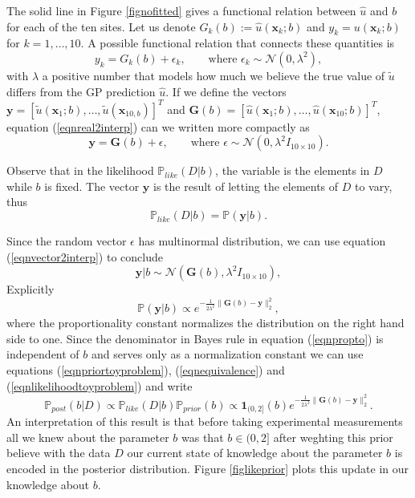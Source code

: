 \documentclass[12pt]{book}
\newcommand{\post}{\mathbb{P}_{post}}
\newcommand{\like}{\mathbb{P}_{like}}
\newcommand{\prior}{\mathbb{P}_{prior}}
\newcommand{\p}{\mathbb{P}}
\newcommand{\x}{\textbf{x}}
\begin{document}
The solid line in Figure \ref{fignofitted} gives a functional relation between $\hat{u}$ and $b$ for each of the 
ten sites.
Let us denote $G_{k}(b):=\hat{u}(\x_{k};b)$ and $y_{k}=u(\x_{k};b)$ for $k=1,\ldots,10$. A possible 
functional relation
that connects these quantities is
\begin{equation}\label{eqnreal2interp}
y_{k}=G_{k}(b)+\epsilon_{k},\qquad\text{where } \epsilon_{k}\sim\mathcal{N}(0,\lambda^{2}),
\end{equation}
with $\lambda$ a positive number that models how much we believe the true value of $\tilde{u}$ differs from the GP prediction $\hat{u}$.
If we define the vectors $\textbf{y}=[\tilde{u}(\x_{1};b),\ldots,\tilde{u}(\x_{10,b})]^{T}$ and 
$\textbf{G}(b)=[\hat{u}(\x_{1};b),\ldots,\hat{u}(\x_{10};b)]^{T}$, equation (\ref{eqnreal2interp}) can we written more compactly as
\begin{equation}\label{eqnvector2interp}
\textbf{y}=\textbf{G}(b)+\epsilon,\qquad\text{where }\epsilon\sim\mathcal{N}(0,\lambda^{2} I_{10\times 10}).
\end{equation}

Observe that in the likelihood $\like(D|b)$, the variable is the elements in $D$ while $b$ is fixed. The
vector $\textbf{y}$ is the result of letting the elements of $D$ to vary, thus
\begin{equation}\label{eqnequivalence}
\like(D|b)=\p(\textbf{y}|b).
\end{equation}

Since the random vector $\epsilon$ has multinormal distribution, we can use equation (\ref{eqnvector2interp})
to conclude \cite{Somersalo}
\begin{equation*}
\textbf{y}|b\sim \mathcal{N}(\textbf{G}(b),\lambda^{2} I_{10\times 10}),
\end{equation*}
Explicitly
\begin{equation}\label{eqnlikelihoodtoyproblem}
\p(\textbf{y}|b)\propto e^{-\frac{1}{2\lambda^{2}}\|\textbf{G}(b)-\textbf{y}\|_{2}^{2}},
\end{equation}
where the proportionality constant normalizes the distribution on the right hand side to one. Since
the denominator in Bayes rule in equation (\ref{eqnpropto}) is independent of $b$ and serves only 
as a normalization constant we can use equations (\ref{eqnpriortoyproblem}), (\ref{eqnequivalence}) and (\ref{eqnlikelihoodtoyproblem})  
and write 
\begin{equation*}
\post(b|D)\propto\like(D|b)\prior(b)\propto \textbf{1}_{(0,2]}(b)e^{-\frac{1}{2\lambda^{2}}\|\textbf{G}(b)-\textbf{y}\|_{2}^{2}}.
\end{equation*}
An interpretation of this result is that before taking experimental measurements all we knew about the parameter $b$ was
that $b\in (0,2]$ after weghting this prior believe with the data $D$ our current state of knowledge about the
parameter $b$ is encoded in the posterior distribution. Figure \ref{figlikeprior} plots this update in our knowledge about $b$.
\end{document}
